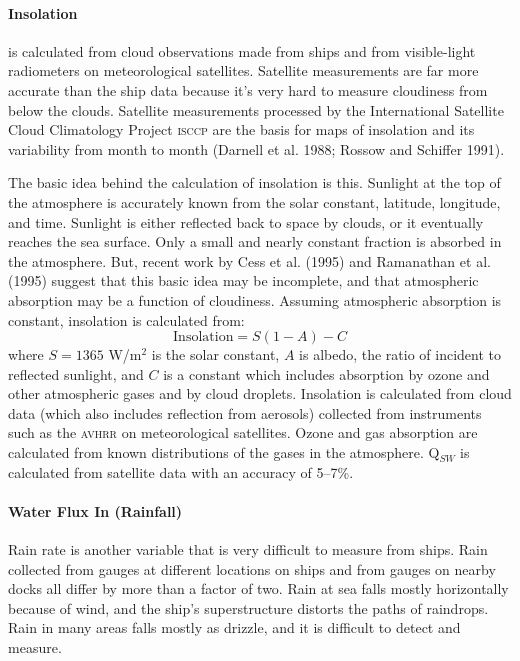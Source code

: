 \paragraph{Insolation}
 is calculated from cloud
observations made from ships and from visible-light radiometers on
meteorological satellites. Satellite measurements are far more
accurate than the ship data because it's very hard to measure
cloudiness from below the clouds. Satellite measurements processed by
the International Satellite Cloud Climatology Project \textsc{isccp}
are the basis for maps of insolation and its
variability from month to month (Darnell et al. 1988; Rossow and
Schiffer 1991).

The basic idea behind the calculation of
insolation is this. Sunlight at the
top of the atmosphere is accurately known from the solar
constant, latitude, longitude,
and time. Sunlight is either reflected back to space by clouds, or it
eventually reaches the sea surface. Only a small and nearly constant
fraction is absorbed in the atmosphere. But, recent work by Cess et
al. (1995) and Ramanathan et al. (1995) suggest that this basic idea
may be incomplete, and that atmospheric absorption may be a function
of cloudiness. Assuming atmospheric absorption is constant,
insolation is calculated from:
\[
\text{Insolation} = S (1 - A) - C
\]
where $S = 1365$ W/m$^2$ is the solar constant, $A$ is albedo, the ratio of incident to reflected
sunlight, and $C$ is a constant which includes absorption by ozone and
other atmospheric gases and by cloud droplets. Insolation is
calculated from cloud data (which also includes reflection from
aerosols) collected from instruments such as the \textsc{avhrr}
on
meteorological satellites.  Ozone and gas absorption are calculated
from known distributions of the gases in the atmosphere. Q$_{SW}$ is
calculated from satellite data with an
accuracy of 5--7\%.

\paragraph{Water Flux In (Rainfall)}
Rain rate is another variable that
is very difficult to measure from ships. Rain collected from gauges at
different locations on ships and from gauges on nearby docks all
differ by more than a factor of two. Rain at sea falls mostly
horizontally because of wind, and the ship's superstructure distorts
the paths of raindrops. Rain in many areas falls mostly as drizzle,
and it is difficult to detect and measure.

